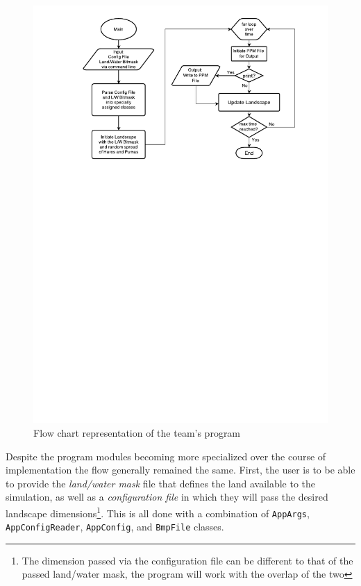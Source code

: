 \begin{figure}
   \begin{center}
      \includegraphics[width=\textwidth]{PS-Coursework-Flow.pdf}
   \end{center}
   \caption{Flow chart representation of the team's program }
   \label{fig:DesignFlowChart}
\end{figure}

Despite the program modules becoming more specialized over the course of implementation the flow generally remained the same. First, the user is to be able to provide the \textit{land/water mask} file that defines the land available to the simulation, as well as a \textit{configuration file} in which they will pass the desired landscape dimensions\footnote{The dimension passed via the configuration file can be different to that of the passed land/water mask, the program will work with the overlap of the two}. This is all done with a combination of \texttt{AppArgs}, \texttt{AppConfigReader}, \texttt{AppConfig}, and \texttt{BmpFile} classes.  

